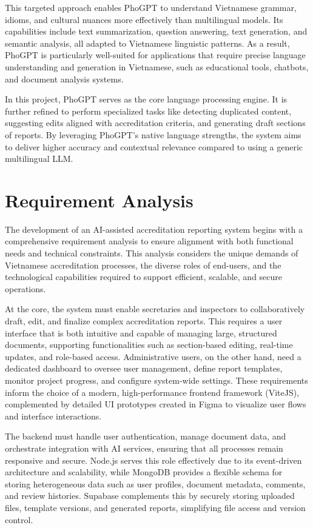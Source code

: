 This targeted approach enables PhoGPT to understand Vietnamese grammar, idioms, and cultural nuances more effectively than multilingual models. Its capabilities include text summarization, question answering, text generation, and semantic analysis, all adapted to Vietnamese linguistic patterns. As a result, PhoGPT is particularly well-suited for applications that require precise language understanding and generation in Vietnamese, such as educational tools, chatbots, and document analysis systems.

In this project, PhoGPT serves as the core language processing engine. It is further refined to perform specialized tasks like detecting duplicated content, suggesting edits aligned with accreditation criteria, and generating draft sections of reports. By leveraging PhoGPT’s native language strengths, the system aims to deliver higher accuracy and contextual relevance compared to using a generic multilingual LLM.

\section{Requirement Analysis}
The development of an AI-assisted accreditation reporting system begins with a comprehensive requirement analysis to ensure alignment with both functional needs and technical constraints. This analysis considers the unique demands of Vietnamese accreditation processes, the diverse roles of end-users, and the technological capabilities required to support efficient, scalable, and secure operations.

At the core, the system must enable secretaries and inspectors to collaboratively draft, edit, and finalize complex accreditation reports. This requires a user interface that is both intuitive and capable of managing large, structured documents, supporting functionalities such as section-based editing, real-time updates, and role-based access. Administrative users, on the other hand, need a dedicated dashboard to oversee user management, define report templates, monitor project progress, and configure system-wide settings. These requirements inform the choice of a modern, high-performance frontend framework (ViteJS), complemented by detailed UI prototypes created in Figma to visualize user flows and interface interactions.

The backend must handle user authentication, manage document data, and orchestrate integration with AI services, ensuring that all processes remain responsive and secure. Node.js serves this role effectively due to its event-driven architecture and scalability, while MongoDB provides a flexible schema for storing heterogeneous data such as user profiles, document metadata, comments, and review histories. Supabase complements this by securely storing uploaded files, template versions, and generated reports, simplifying file access and version control.


